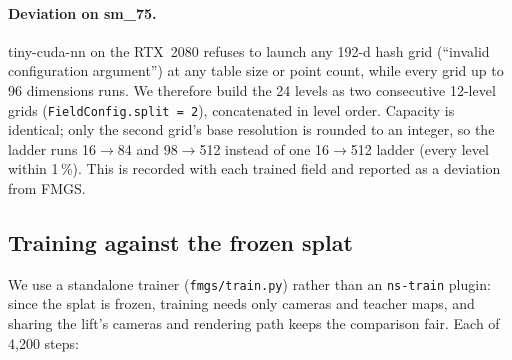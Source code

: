 \documentclass[11pt,a4paper]{article}
\newcommand{\code}[1]{\texttt{#1}}
\begin{document}
\paragraph{Deviation on sm\_75.} tiny-cuda-nn on the RTX~2080 refuses to launch any 192-d hash grid
(``invalid configuration argument'') at any table size or point count, while every grid up to 96 dimensions runs.
We therefore build the 24 levels as two consecutive 12-level grids (\code{FieldConfig.split = 2}), concatenated
in level order. Capacity is identical; only the second grid's base resolution is rounded to an integer, so the
ladder runs 16$\rightarrow$84 and 98$\rightarrow$512 instead of one 16$\rightarrow$512 ladder (every level within
1\,\%). This is recorded with each trained field and reported as a deviation from FMGS.

\subsection{Training against the frozen splat}
We use a standalone trainer (\code{fmgs/train.py}) rather than an \code{ns-train} plugin: since the splat is
frozen, training needs only cameras and teacher maps, and sharing the lift's cameras and rendering path keeps the
comparison fair. Each of 4{,}200 steps:
\end{document}
